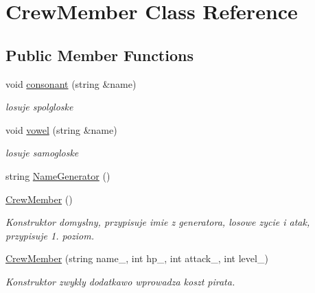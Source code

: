\hypertarget{class_crew_member}{}\section{Crew\+Member Class Reference}
\label{class_crew_member}
\subsection*{Public Member Functions}
\begin{DoxyCompactItemize}
\item 
\mbox{\label{class_crew_member_a822fee67c0e8a9416bc208824d966961}} 
void \hyperlink{class_crew_member_a822fee67c0e8a9416bc208824d966961}{consonant} (string \&name)
\begin{DoxyCompactList}\small\item\em losuje spolgloske \end{DoxyCompactList}\item 
\mbox{\label{class_crew_member_a9cef5974e00cdd38adfa6c472f551605}} 
void \hyperlink{class_crew_member_a9cef5974e00cdd38adfa6c472f551605}{vowel} (string \&name)
\begin{DoxyCompactList}\small\item\em losuje samogloske \end{DoxyCompactList}\item 
string \hyperlink{class_crew_member_a3b22e0361d970a65120f4f83be61a506}{Name\+Generator} ()
\item 
\mbox{\label{class_crew_member_aa37f9cc1bc79a2661fa6cc61b148fb87}} 
\hyperlink{class_crew_member_aa37f9cc1bc79a2661fa6cc61b148fb87}{Crew\+Member} ()
\begin{DoxyCompactList}\small\item\em Konstruktor domyslny, przypisuje imie z generatora, losowe zycie i atak, przypisuje 1. poziom. \end{DoxyCompactList}\item 
\mbox{\label{class_crew_member_a93f235bcda7aabc4e97673e446fc17ea}} 
\hyperlink{class_crew_member_a93f235bcda7aabc4e97673e446fc17ea}{Crew\+Member} (string name\+\_\+, int hp\+\_\+, int attack\+\_\+, int level\+\_\+)
\begin{DoxyCompactList}\small\item\em Konstruktor zwykly dodatkawo wprowadza koszt pirata. \end{DoxyCompactList}\item 

\end{DoxyCompactItemize}
